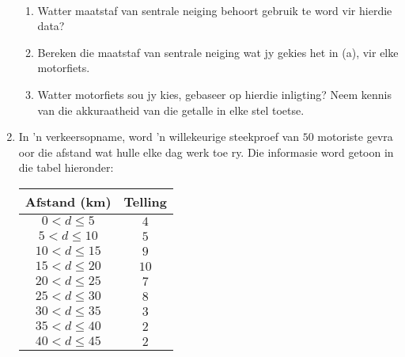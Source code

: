 \begin{eocexercises}{}
\begin{enumerate}[itemsep=6pt, label=\textbf{\arabic*}.]
\begin{center}
\begin{tabular}
      \end{tabular}
    \end{center}
\vspace {8pt}\\
\begin{enumerate}[noitemsep, label=\textbf{(\alph*)} ]
    \item Watter maatstaf van sentrale neiging behoort gebruik te word vir hierdie data?
    \item Bereken die maatstaf van sentrale neiging wat jy gekies het in (a), vir elke motorfiets.
    \item Watter motorfiets sou jy kies, gebaseer op hierdie inligting? Neem kennis van die akkuraatheid van die getalle in elke stel toetse. 
      
    \end{enumerate}

  \item In ’n verkeersopname, word ’n willekeurige steekproef van $50$ motoriste gevra oor die afstand wat hulle elke dag werk toe ry. Die informasie word getoon in die tabel hieronder: \\
    \begin{center}
      \begin{tabular}{|c|c|} \hline
     
        \textbf{Afstand (km)} & \textbf{Telling} \\ \hline

        $0 < d \leq 5$ & $4$ \\ \hline
        $5 < d \leq 10$ & $5$ \\\hline
        $10 < d \leq 15$ & $9$ \\\hline
        $15 < d \leq 20$ & $10$ \\\hline
        $20 < d \leq 25$ & $7$ \\\hline
        $25 < d \leq 30$ & $8$ \\\hline
        $30 < d \leq 35$ & $3$ \\\hline
        $35 < d \leq 40$ & $2$ \\\hline
        $40 < d \leq 45$ & $2$ \\\hline


\end{tabular}
\end{center}
\end{enumerate}
\end{eocexercises}
